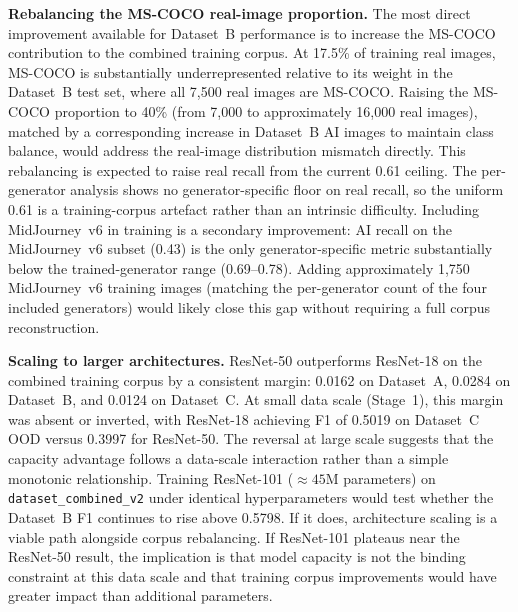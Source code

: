 \textbf{Rebalancing the MS-COCO real-image proportion.} The most direct improvement
available for Dataset~B performance is to increase the MS-COCO contribution to the
combined training corpus. At 17.5\% of training real images, MS-COCO is substantially
underrepresented relative to its weight in the Dataset~B test set, where all 7,500 real
images are MS-COCO. Raising the MS-COCO proportion to 40\% (from 7,000 to approximately
16,000 real images), matched by a corresponding increase in Dataset~B AI images to
maintain class balance, would address the real-image distribution mismatch directly.
This rebalancing is expected to raise real recall from the current 0.61 ceiling. The
per-generator analysis shows no generator-specific floor on real recall, so the uniform
0.61 is a training-corpus artefact rather than an intrinsic difficulty. Including
MidJourney~v6 in training is a secondary improvement: AI recall on the MidJourney~v6
subset (0.43) is the only generator-specific metric substantially below the
trained-generator range (0.69--0.78). Adding approximately 1,750 MidJourney~v6 training
images (matching the per-generator count of the four included generators) would likely
close this gap without requiring a full corpus reconstruction.

\textbf{Scaling to larger architectures.} ResNet-50 outperforms ResNet-18 on the
combined training corpus by a consistent margin: 0.0162 on Dataset~A, 0.0284 on
Dataset~B, and 0.0124 on Dataset~C. At small data scale (Stage~1), this margin was absent
or inverted, with ResNet-18 achieving F1 of 0.5019 on Dataset~C OOD versus 0.3997 for
ResNet-50. The reversal at large scale suggests that the capacity advantage follows a
data-scale interaction rather than a simple monotonic relationship. Training ResNet-101
(${\approx}45$M parameters) on \texttt{dataset\_combined\_v2} under identical
hyperparameters would test whether the Dataset~B F1 continues to rise above 0.5798. If
it does, architecture scaling is a viable path alongside corpus rebalancing. If
ResNet-101 plateaus near the ResNet-50 result, the implication is that model capacity is
not the binding constraint at this data scale and that training corpus improvements would
have greater impact than additional parameters.


